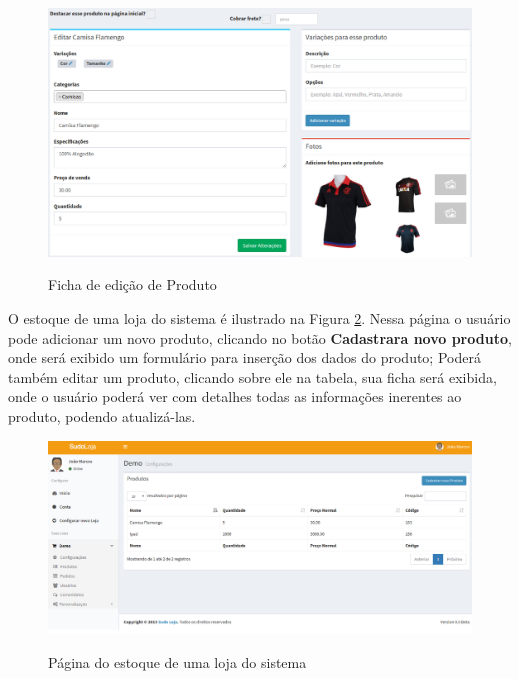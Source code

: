 \documentclass[a4paper,12pt]{monografia}
\begin{document}
\begin{figure}[H]
\centering
\caption{Ficha de edição de Produto}
\centering
\includegraphics[width=15cm]{img/sistema/ficha-produto.eps}\\
\label{fig:ficha-produto}
\end{figure}

O estoque de uma loja do sistema é ilustrado na Figura \ref{fig:sistema-estoque}. Nessa página o usuário pode adicionar um novo produto, clicando no botão \textbf{Cadastrara novo produto}, onde será exibido um formulário para inserção dos dados do produto; Poderá também editar um produto, clicando sobre ele na tabela, sua ficha será exibida, onde o usuário poderá ver com detalhes todas as informações inerentes ao produto, podendo atualizá-las.

\vspace{1,5cm}
\begin{figure}[H]
\centering
\caption{Página do estoque de uma loja do sistema}
\centering
\includegraphics[width=15cm]{img/sistema/pagina-estoque.eps}\\
\label{fig:sistema-estoque}
\end{figure}


\end{document}
